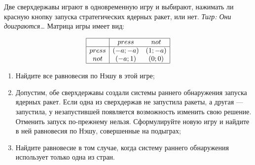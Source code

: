\begin{problem}
Две сверхдержавы играют в одновременную игру и выбирают, нажимать ли красную кнопку запуска стратегических ядерных ракет, или нет. {\it Тигр: Они доиграются\ldots } Матрица игры имеет вид:\par
\[\begin{array}{|c|cc|}  \hline {} & {press} & {not} \\  \hline {press} & {\left(-a;-a\right)} & {\left(1;-a\right)} \\ {not} & {\left(-a;1\right)} & {\left(0;0\right)} \\  \hline  \end{array}\]
\begin{enumerate}
\item  Найдите все равновесия по Нэшу в этой игре;\par
\item Допустим, обе сверхдержавы создали системы раннего обнаружения запуска ядерных ракет. Если одна из сверхдержав не запустила ракеты, а другая — запустила, у незапустившей появляется возможность изменить свою решение. Отменить запуск по-прежнему нельзя. Сформулируйте новую игру и найдите в ней равновесия по Нэшу, совершенные на подыграх;\par
\item  Найдите равновесие в том случае, когда систему раннего обнаружения использует только одна из стран.\par
\end{enumerate}


\begin{sol}

\end{sol}
\end{problem}



